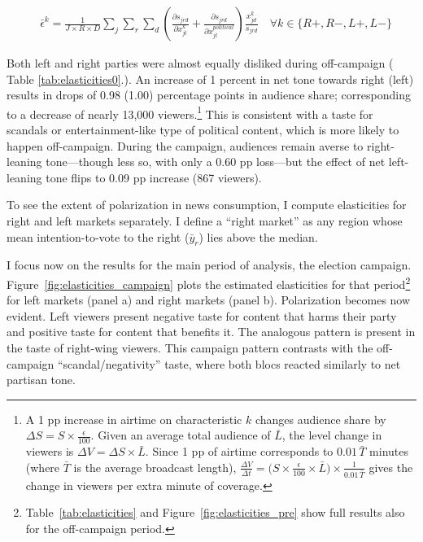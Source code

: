 \documentclass[12pt]{article}
\begin{document}

\begin{equation}\label{eq:elasticities}
	\begin{aligned}
		& \bar{\epsilon}^k= \frac{1}{J\times R \times D}\sum_{j}\sum_{r} \sum_{d} \left(\frac{\partial s_{jrd}}{\partial x_{jt}^k} +  \frac{\partial s_{jrd}}{\partial x_{jt}^{political}} \right) \frac{x_{jd}^k}{s_{jrd}}    \quad \forall k \in \{R+,R-,L+,L-\}
	\end{aligned}
\end{equation}             



Both left and right parties were almost equally disliked during off-campaign ( Table \ref{tab:elasticities0}.). An increase of 1 percent in net tone  towards right (left) results in drops of 0.98 (1.00) percentage points in audience share; corresponding to a decrease of nearly 13,000 viewers.\footnote{A 1 pp increase in airtime on characteristic $k$ changes audience share by $\Delta S = S \times \tfrac{\epsilon}{100}$. Given an average total audience of $\bar{L}$, the level change in viewers is $\Delta V = \Delta S \times \bar{L}$. Since 1 pp of airtime corresponds to $0.01\,\bar{T}$ minutes (where $\bar{T}$ is the average broadcast length), $\tfrac{\Delta V}{\Delta t} = \bigl(S \times \tfrac{\epsilon}{100} \times \bar{L}\bigr) \times \tfrac{1}{0.01\,\bar{T}}$ gives the change in viewers per extra minute of coverage.} This is consistent with a taste for scandals or entertainment-like type of political content, which is more likely to happen off-campaign. During the campaign, audiences remain averse to right-leaning tone—though less so, with only a 0.60 pp loss—but the effect of net left-leaning tone flips to 0.09 pp increase (867 viewers).


To see the extent of polarization in news consumption, I  compute elasticities for right and left markets separately. I define a “right market” as any region whose mean intention-to-vote to the right  ($\bar{y}_r$) lies above the median. 

I focus now on the results for the main period of analysis, the election campaign. Figure~\ref{fig:elasticities_campaign} plots the estimated elasticities for that period\footnote{Table~\ref{tab:elasticities} and 	 Figure~\ref{fig:elasticities_pre} show full results also for the off-campaign period. } for left markets (panel a) and right markets (panel b).	Polarization becomes now evident. Left viewers present negative taste for content that harms their party and positive taste for content that benefits it. The analogous pattern is present in the taste of right-wing viewers. This campaign pattern contrasts with the off-campaign “scandal/negativity” taste, where both blocs reacted similarly to net partisan tone.
\end{document}
